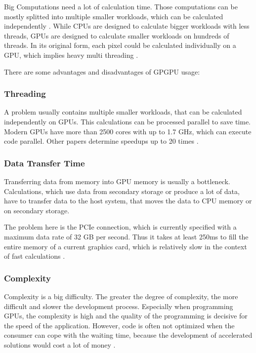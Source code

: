 \documentclass[conference]{IEEEtran}
\begin{document}
		
		
		Big Computations need a lot of calculation time. Those computations can be mostly splitted into multiple smaller workloads, which can be calculated independently \cite{yang2010gpgpu}. While CPUs are designed to calculate bigger workloads with less threads, GPUs are designed to calculate smaller workloads on hundreds of threads. In its original form, each pixel could be calculated individually on a GPU, which implies heavy multi threading \cite{lee2010debunking}.
		
		
		
		There are some advantages and disadvantages of GPGPU usage:
		
		\subsubsection{Threading} A problem usually contains multiple smaller workloads, that can be calculated independently on GPUs. This calculations can be processed parallel to save time. Modern GPUs have more than 2500 cores with up to 1.7 GHz, which can execute code parallel. Other papers determine speedups up to 20 times \cite{nvidia_gtx_1080}.
		
		
		\subsubsection{Data Transfer Time}  Transferring data from memory into GPU memory is usually a bottleneck. Calculations, which use data from secondary storage or produce a lot of data, have to transfer data to the host system, that moves the data to CPU memory or on secondary storage.
		
		The problem here is the PCIe connection, which is currently specified with a maximum data rate of 32 GB per second. Thus it takes at least 250ms to fill the entire memory of a current graphics card, which is relatively slow in the context of fast calculations \cite{nvidia_gtx_1080}.
		
		
		\subsubsection{Complexity} Complexity is a big difficulty. The greater the degree of complexity, the more difficult and slower the development process.  Especially when programming GPUs, the complexity is high and the quality of the programming is decisive for the speed of the application. However, code is often not optimized when the consumer can cope with the waiting time, because the development of accelerated solutions would cost a lot of money \cite{ueng2008cuda}.
		
\end{document}
